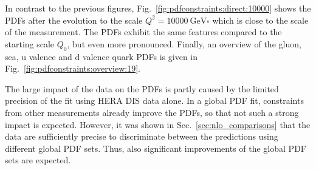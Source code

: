 In contrast to the previous figures, Fig.~\ref{fig:pdfconstraints:direct:10000}
shows the PDFs after the evolution to the scale $Q^2 = \SI{10000}{\GeV \square}$
which is close to the scale of the measurement. The PDFs exhibit the same
features compared to the starting scale $Q_0$, but even more pronounced.
Finally, an overview of the gluon, sea, u valence and d valence quark PDFs is
given in Fig.~\ref{fig:pdfconstraints:overview:19}. 

The large impact of the data on the PDFs is partly caused by the limited
precision of the fit using HERA DIS data alone. In a global PDF fit, constraints
from other measurements already improve the PDFs, so that not such a strong
impact is expected. However, it was shown in Sec.~\ref{sec:nlo_comparisons} that
the data are sufficiently precise to discriminate between the predictions using
different global PDF sets. Thus, also significant improvements of the global
PDF sets are expected.

